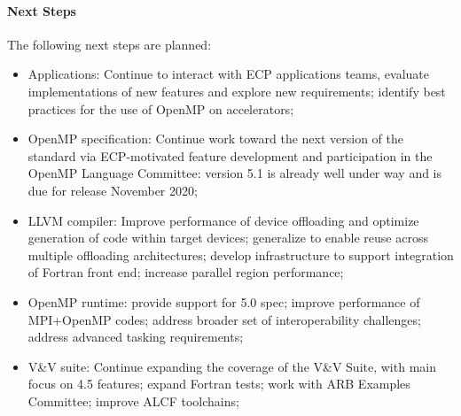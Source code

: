 \paragraph{Next Steps}
The following next steps are planned:
\begin{itemize}
\item Applications: Continue to interact with ECP applications teams, evaluate implementations of new features and explore new requirements; 
 identify best practices for the use of OpenMP on accelerators;
\item OpenMP specification: Continue work toward the next version of the standard via ECP-motivated feature development and participation in the OpenMP Language Committee: version 5.1 is already well under way and is due for release November 2020;
\item LLVM compiler: Improve performance of device offloading and optimize generation of code within target devices; generalize to enable reuse across multiple offloading architectures; develop infrastructure to support integration of Fortran front end; increase parallel region performance; 
\item OpenMP runtime: provide support for 5.0 spec; improve performance of MPI+OpenMP codes; address broader set of interoperability challenges; address advanced tasking requirements;
\item V\&V suite: Continue expanding the coverage of the V\&V Suite, with main focus on 4.5 features;  expand Fortran tests; work with ARB Examples Committee; improve ALCF toolchains;
\end{itemize}

